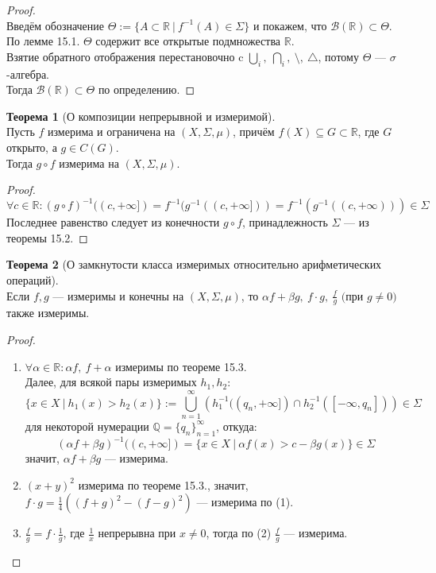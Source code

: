 \documentclass[11pt,a4paper]{report}
\def\Real{\mathbb{R}}
\def\Rational{\mathbb{Q}}
\theoremstyle{definition}
\theoremstyle{definition}
\newtheorem{theorem}{Теорема}[section]
\theoremstyle{definition}
\begin{document}
	\begin{proof}$  $\\
		Введём обозначение $ \Theta := \{A \subset \Real\ |\ f^{-1}(A) \in \Sigma \} $ и покажем, что $ \mathcal{B}(\Real) \subset \Theta $.\\
		По лемме 15.1. $ \Theta $ содержит все открытые подмножества $ \Real $.\\ 
		Взятие обратного отображения перестановочно c $ \bigcup_{i},\ \bigcap_{i},\ \setminus,\ \triangle $, потому $ \Theta $ — $ \sigma $-алгебра.\\
		Тогда $ \mathcal{B}(\Real) \subset \Theta $ по определению.
	\end{proof}
	\begin{theorem}[О композиции непрерывной и измеримой]$  $\\
		 Пусть $ f $ измерима и ограничена на $ (X, \Sigma, \mu) $, причём $ f(X) \subseteq G \subset \Real $, где $ G $ открыто, а $ g \in C(G) $.\\
		 Тогда $ g \circ f $ измерима на $ (X, \Sigma, \mu) $.
	\end{theorem}
	\begin{proof}
		\[ \forall c \in \Real: (g \circ f)^{-1}((c, +\infty]) = f^{-1}(g^{-1}((c, +\infty])) = f^{-1}(g^{-1}((c, +\infty))) \in \Sigma \]
		Последнее равенство следует из конечности $ g \circ f $, принадлежность $ \Sigma $ — из теоремы 15.2.
	\end{proof}
	\begin{theorem}[О замкнутости класса измеримых относительно арифметических операций]$  $\\
		Если $ f, g $ — измеримы и конечны на $ (X, \Sigma, \mu) $, то $ \alpha f + \beta g,\ f \cdot g,\ \frac{f}{g} \mbox{ (при } g \neq 0) $ также измеримы.
	\end{theorem}
	\begin{proof}$  $
		\begin{enumerate}[(1)]
			\item $ \forall \alpha \in \Real: \alpha f,\ f + \alpha $ измеримы по теореме 15.3.\\
						Далее, для всякой пары измеримых $ h_{1}, h_{2} $: 
						\[ \{x \in X\ |\  h_{1}(x) > h_{2}(x) \} := \bigcup\limits_{n=1}^{\infty}{\left ( h^{-1}_{1}((q_{n}, +\infty]) \cap h^{-1}_{2}([-\infty, q_{n}])\right ) } \in \Sigma \]
						для некоторой нумерации $ \Rational = \{q_{n}\}_{n=1}^{\infty} $, откуда: \[ (\alpha f + \beta g)^{-1}((c, +\infty]) = \{x \in X\ |\ \alpha f(x) > c - \beta g(x) \} \in \Sigma \]
						значит, $ \alpha f + \beta g $ — измерима.
			\item $ (x + y)^{2} $ измерима по теореме 15.3., значит, $ f \cdot g = \frac{1}{4}((f + g)^{2} - (f - g)^{2}) $ — измерима по (1).
			\item $ \frac{f}{g} = f \cdot \frac{1}{g} $, где $ \frac{1}{x} $ непрерывна при $ x \neq 0 $, тогда по (2) $ \frac{f}{g} $ — ­измерима.
		\end{enumerate}
	\end{proof}
\end{document}
